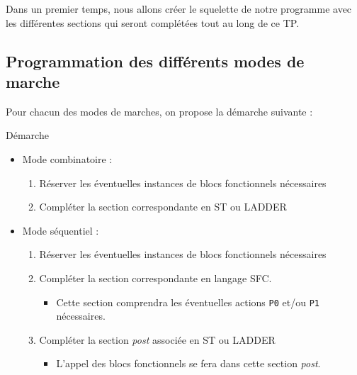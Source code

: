 \begin{UPSTIManipulation}
    Dans un premier temps, nous allons créer le squelette de notre programme avec les différentes sections qui seront complétées tout au long de ce TP.
\end{UPSTIManipulation}

\begin{UPSTIManipulation}
\end{UPSTIManipulation}

\subsection{Programmation des différents modes de marche}
Pour chacun des modes de marches, on propose la démarche suivante : 

\begin{UPSTIinfor}{Démarche}
    \begin{itemize}
        \item Mode combinatoire : 
        \begin{enumerate}
            \item Réserver les éventuelles instances de blocs fonctionnels nécessaires
            \item Compléter la section correspondante en ST ou LADDER 
        \end{enumerate}
        \item Mode séquentiel :
        \begin{enumerate}
            \item Réserver les éventuelles instances de blocs fonctionnels nécessaires
            \item Compléter la section correspondante en langage SFC.
            \begin{itemize}
                \item Cette section comprendra les éventuelles actions \texttt{P0} et/ou \texttt{P1} nécessaires. 
            \end{itemize}
            \item Compléter la section \textit{post} associée en ST ou LADDER
            \begin{itemize}
                \item L'appel des blocs fonctionnels se fera dans cette section \textit{post}.
            \end{itemize}
        \end{enumerate}
    \end{itemize}
\end{UPSTIinfor}

